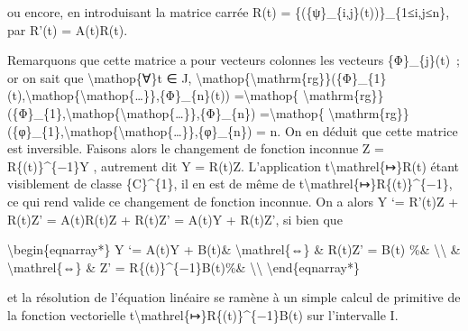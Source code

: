 \documentclass[]{article}
\begin{document}
ou encore, en introduisant la matrice carrée R(t) =
\{(\{ψ\}\_\{i,j\}(t))\}\_\{1≤i,j≤n\}, par R'(t) = A(t)R(t).

Remarquons que cette matrice a pour vecteurs colonnes les vecteurs
\{Φ\}\_\{j\}(t)~; or on sait que \textbackslash{}mathop\{∀\}t ∈ J,
\textbackslash{}mathop\{\textbackslash{}mathrm\{rg\}\}(\{Φ\}\_\{1\}(t),\textbackslash{}mathop\{\textbackslash{}mathop\{\ldots{}\}\},\{Φ\}\_\{n\}(t))
=\textbackslash{}mathop\{
\textbackslash{}mathrm\{rg\}\}(\{Φ\}\_\{1\},\textbackslash{}mathop\{\textbackslash{}mathop\{\ldots{}\}\},\{Φ\}\_\{n\})
=\textbackslash{}mathop\{
\textbackslash{}mathrm\{rg\}\}(\{φ\}\_\{1\},\textbackslash{}mathop\{\textbackslash{}mathop\{\ldots{}\}\},\{φ\}\_\{n\})
= n. On en déduit que cette matrice est inversible. Faisons alors le
changement de fonction inconnue Z = R\{(t)\}\^{}\{−1\}Y , autrement dit
Y = R(t)Z. L'application t\textbackslash{}mathrel\{↦\}R(t) étant
visiblement de classe \{C\}\^{}\{1\}, il en est de même de
t\textbackslash{}mathrel\{↦\}R\{(t)\}\^{}\{−1\}, ce qui rend valide ce
changement de fonction inconnue. On a alors Y `= R'(t)Z + R(t)Z' =
A(t)R(t)Z + R(t)Z' = A(t)Y + R(t)Z', si bien que

\textbackslash{}begin\{eqnarray*\} Y `= A(t)Y + B(t)\&
\textbackslash{}mathrel\{⇔\} \& R(t)Z' = B(t) \%\&
\textbackslash{}\textbackslash{} \& \textbackslash{}mathrel\{⇔\} \& Z' =
R\{(t)\}\^{}\{−1\}B(t)\%\& \textbackslash{}\textbackslash{}
\textbackslash{}end\{eqnarray*\}

et la résolution de l'équation linéaire se ramène à un simple calcul de
primitive de la fonction vectorielle
t\textbackslash{}mathrel\{↦\}R\{(t)\}\^{}\{−1\}B(t) sur l'intervalle I.
\end{document}
